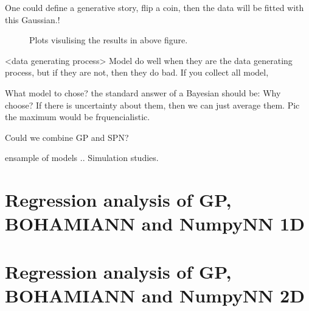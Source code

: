One could define a generative story, flip a coin, then the data will
be fitted with this Gaussian.! 

\begin{figure}
  \caption{Plots visulising the results in above figure.}
\end{figure}

<data generating process>
Model do well when they are the data generating process, but if they are not, then
they do bad. If you collect all model, 

What model to chose? the standard answer of a Bayesian should be: Why choose? If there 
is uncertainty about them, then we can just average them. Pic the maximum would be frquencialistic.

Could we combine GP and SPN?

ensample of models ..
Simulation studies. 



\section{Regression analysis of GP, BOHAMIANN and NumpyNN 1D}

\section{Regression analysis of GP, BOHAMIANN and NumpyNN 2D}

